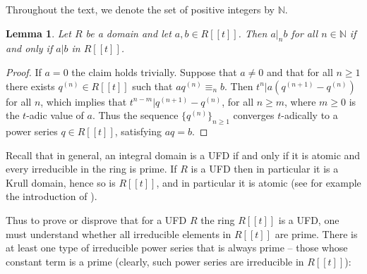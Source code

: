 \documentclass{article}
\newcommand{\N}{\mathbb{N}}
\theoremstyle{plain}
\newtheorem{lemma}[theorem]{Lemma}
\theoremstyle{definition}
\theoremstyle{remark}
\theoremstyle{plain}
\begin{document}
Throughout the text, we denote the set of positive integers by $\N$.

\begin{lemma}\label{lem_a|b} Let $R$ be a domain and let $a,b \in R[[t]]$. Then $a|_nb$ for all $n \in \N$ if and only if $a|b$ in $R[[t]]$. \end{lemma}
\begin{proof}
    If $a = 0$ the claim holds trivially. Suppose that $a \neq 0$ and that for all $n \geq 1$ there exists $q^{(n)} \in R[[t]]$ such that $aq^{(n)} \equiv_n b $. Then $t^n | a(q^{(n+1)}-q^{(n)})$ for all $n$, which implies that  $t^{n-m} | q^{(n+1)}-q^{(n)}$, for all $n\geq m$, where $m \geq 0$ is the $t$-adic value of $a$. Thus the sequence $\{q^{(n)}\}_{n \geq 1}$ converges $t$-adically to a power series $q \in R[[t]]$, satisfying $aq = b$.
\end{proof}



Recall that in general, an integral domain is a UFD if and only if it is atomic and every irreducible in the ring is prime. If $R$ is a UFD then in particular it is a Krull domain, hence so is $R[[t]]$, and in particular it is atomic (see for example the introduction of \cite{Coy22}). 

Thus to prove or disprove that for a UFD $R$ the ring $R[[t]]$ is a UFD, one must understand whether all irreducible elements in $R[[t]]$ are prime. There is at least one type of irreducible power series that is always prime -- those whose constant term is a prime (clearly, such power series are irreducible in $R[[t]]$):
\end{document}
